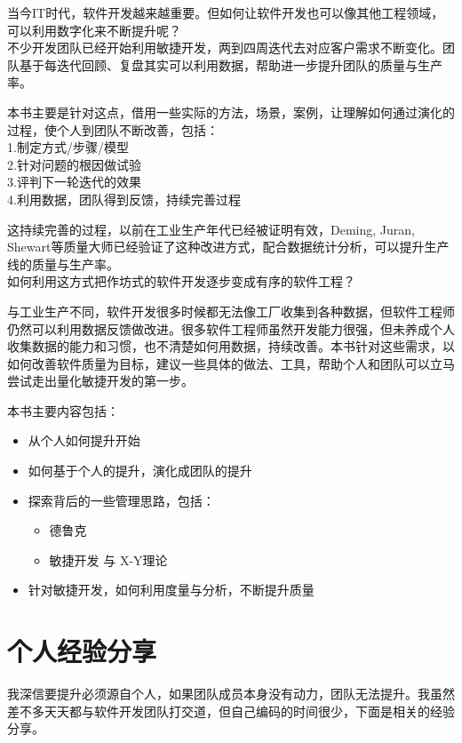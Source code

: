 \documentclass{book}        %
\providecommand{\tightlist}{%
  \setlength{\itemsep}{0pt}\setlength{\parskip}{0pt}}
\begin{document}
当今IT时代，软件开发越来越重要。但如何让软件开发也可以像其他工程领域，可以利用数字化来不断提升呢？\\
不少开发团队已经开始利用敏捷开发，两到四周迭代去对应客户需求不断变化。团队基于每迭代回顾、复盘其实可以利用数据，帮助进一步提升团队的质量与生产率。

本书主要是针对这点，借用一些实际的方法，场景，案例，让理解如何通过演化的过程，使个人到团队不断改善，包括：\\
1.制定方式/步骤/模型\\
2.针对问题的根因做试验\\
3.评判下一轮迭代的效果\\
4.利用数据，团队得到反馈，持续完善过程

这持续完善的过程，以前在工业生产年代已经被证明有效，Deming, Juran, Shewart等质量大师已经验证了这种改进方式，配合数据统计分析，可以提升生产线的质量与生产率。\\
如何利用这方式把作坊式的软件开发逐步变成有序的软件工程？

与工业生产不同，软件开发很多时候都无法像工厂收集到各种数据，但软件工程师仍然可以利用数据反馈做改进。很多软件工程师虽然开发能力很强，但未养成个人收集数据的能力和习惯，也不清楚如何用数据，持续改善。本书针对这些需求，以如何改善软件质量为目标，建议一些具体的做法、工具，帮助个人和团队可以立马尝试走出量化敏捷开发的第一步。

本书主要内容包括：

\begin{itemize}
\tightlist
\item
  从个人如何提升开始
\item
  如何基于个人的提升，演化成团队的提升
\item
  探索背后的一些管理思路，包括：

  \begin{itemize}
  \tightlist
  \item
    德鲁克
  \item
    敏捷开发 与 X-Y理论
  \end{itemize}
\item
  针对敏捷开发，如何利用度量与分析，不断提升质量\\
\end{itemize}


\part{个人经验分享}我深信要提升必须源自个人，如果团队成员本身没有动力，团队无法提升。我虽然差不多天天都与软件开发团队打交道，但自己编码的时间很少，下面是相关的经验分享。\\
\end{document}
